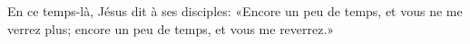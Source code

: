 En ce temps-là, Jésus dit à ses disciples:
	«Encore un peu de temps, et vous ne me verrez plus;
	encore un peu de temps, et vous me reverrez.»
